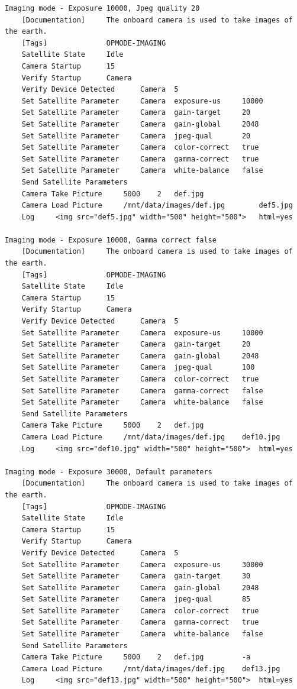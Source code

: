 \documentclass[english,12pt,a4paper,pdftex,elec,utf8]{aaltothesis}
\begin{document}
\begin{verbatim}
Imaging mode - Exposure 10000, Jpeg quality 20
	[Documentation]		The onboard camera is used to take images of the earth.
	[Tags]				OPMODE-IMAGING
	Satellite State		Idle
	Camera Startup		15
	Verify Startup		Camera
	Verify Device Detected		Camera 	5
	Set Satellite Parameter		Camera	exposure-us		10000
	Set Satellite Parameter		Camera	gain-target		20
	Set Satellite Parameter		Camera	gain-global		2048
	Set Satellite Parameter		Camera	jpeg-qual		20
	Set Satellite Parameter		Camera	color-correct	true
	Set Satellite Parameter		Camera	gamma-correct	true
	Set Satellite Parameter		Camera	white-balance	false
	Send Satellite Parameters
	Camera Take Picture		5000	2	def.jpg
	Camera Load Picture		/mnt/data/images/def.jpg		def5.jpg
	Log		<img src="def5.jpg" width="500" height="500">	html=yes
	
Imaging mode - Exposure 10000, Gamma correct false
	[Documentation]		The onboard camera is used to take images of the earth.
	[Tags]				OPMODE-IMAGING
	Satellite State		Idle
	Camera Startup		15
	Verify Startup		Camera
	Verify Device Detected		Camera 	5
	Set Satellite Parameter		Camera	exposure-us		10000
	Set Satellite Parameter		Camera	gain-target		20
	Set Satellite Parameter		Camera	gain-global		2048
	Set Satellite Parameter		Camera	jpeg-qual		100
	Set Satellite Parameter		Camera	color-correct	true
	Set Satellite Parameter		Camera	gamma-correct	false
	Set Satellite Parameter		Camera	white-balance	false
	Send Satellite Parameters
	Camera Take Picture		5000	2	def.jpg
	Camera Load Picture		/mnt/data/images/def.jpg	def10.jpg
	Log		<img src="def10.jpg" width="500" height="500">	html=yes
	
Imaging mode - Exposure 30000, Default parameters
	[Documentation]		The onboard camera is used to take images of the earth.
	[Tags]				OPMODE-IMAGING
	Satellite State		Idle
	Camera Startup		15
	Verify Startup		Camera
	Verify Device Detected		Camera 	5
	Set Satellite Parameter		Camera	exposure-us		30000
	Set Satellite Parameter		Camera	gain-target		30
	Set Satellite Parameter		Camera	gain-global		2048
	Set Satellite Parameter		Camera	jpeg-qual		85
	Set Satellite Parameter		Camera	color-correct	true
	Set Satellite Parameter		Camera	gamma-correct	true
	Set Satellite Parameter		Camera	white-balance	false
	Send Satellite Parameters
	Camera Take Picture		5000	2	def.jpg 		-a
	Camera Load Picture		/mnt/data/images/def.jpg	def13.jpg
	Log		<img src="def13.jpg" width="500" height="500">	html=yes


\end{verbatim}
\end{document}
